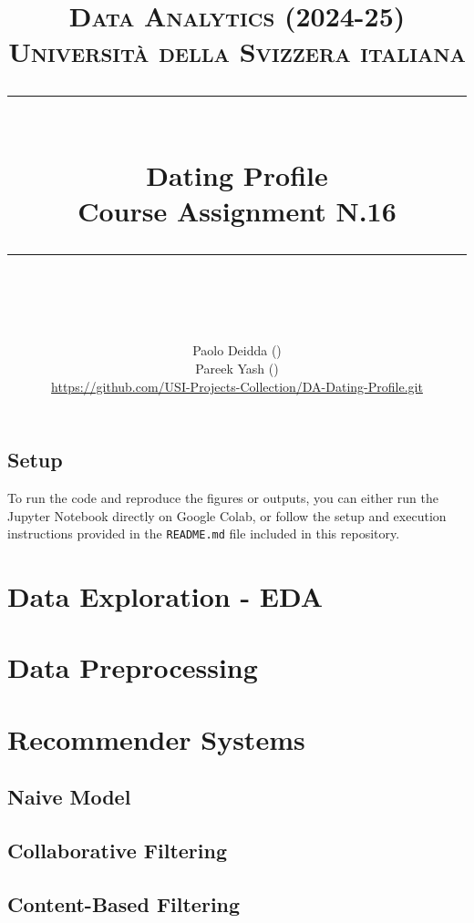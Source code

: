 \documentclass{article}
\title{
	\normalfont\normalsize
	\textsc{Data Analytics (2024-25)\\
	Universit\`a della Svizzera italiana}\\
	\rule{\linewidth}{0.5pt}\\
	{\huge Dating Profile\\
	\small Course Assignment N.16}\\
	\rule{\linewidth}{1pt}\\
	\vspace{5pt}
}
\author{
	Paolo Deidda (\text{paolo.deidda@usi.ch}) \\ 
	Pareek Yash (\text{yash.pareek@usi.ch})\\
	\url{https://github.com/USI-Projects-Collection/DA-Dating-Profile.git}
	}
\begin{document}
\maketitle

\tableofcontents


\vspace*{\fill}

\subsection*{Setup}

To run the code and reproduce the figures or outputs, you can either run the Jupyter Notebook directly on Google Colab, or follow the setup and execution instructions provided in the \texttt{README.md} file included in this repository.



\newpage

\section{Data Exploration - EDA}


\section{Data Preprocessing}



\section{Recommender Systems}
\subsection{Naive Model}

\subsection{Collaborative Filtering}

\subsection{Content-Based Filtering}

\end{document}
